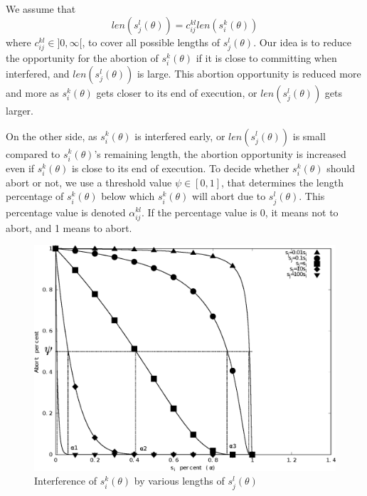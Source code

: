 \documentclass[conference]{IEEEtran}
\begin{document}
We assume that 
\begin{equation}
len(s_{j}^{l}(\theta))=c_{ij}^{kl}len(s_{i}^{k}(\theta))
\label{cm_eq}\end{equation}
where $c_{ij}^{kl}\in]0,\infty[$, to cover all possible lengths of $s_{j}^{l}(\theta)$.
Our idea is to reduce the opportunity for the abortion of $s_{i}^{k}(\theta)$ if it is close to committing when interfered, and $len(s_{j}^{l}(\theta))$ is large. This abortion opportunity is reduced more and more as $s_{i}^{k}(\theta)$ gets closer to its end of execution, or $len(s_{j}^{l}(\theta))$ gets larger. 

On the other side, as $s_{i}^{k}(\theta)$ is interfered early,
or $len(s_{j}^{l}(\theta))$ is small compared to $s_{i}^{k}(\theta)$'s remaining length, the abortion opportunity 
is increased even if $s_i^k (\theta)$ is close to its end of execution. To decide whether $s_{i}^{k}(\theta)$ should abort or not, we use a threshold value $\psi\in[0,1]$, that determines
the length percentage of $s_{i}^{k}(\theta)$ below which $s_{i}^{k}(\theta)$ will abort due to $s_{j}^{l}(\theta)$. This percentage value is denoted $\alpha_{ij}^{kl}$. 
%
If the percentage value is 0, it means not to abort, and 1 means to abort. 


%
\begin{figure}[htbp]
\centering
\includegraphics[scale=0.4]{figures/figure16}
\caption{\label{fig16}Interference of $s_{i}^{k}(\theta)$ by various lengths of 
$s_{j}^{l}(\theta)$}
\end{figure}
\end{document}
